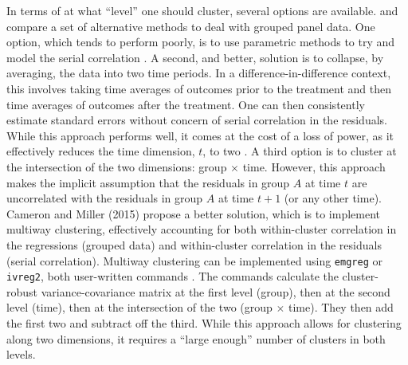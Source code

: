 \documentclass[11pt]{article}
\begin{document}
In terms of at what ``level'' one should cluster, several options are available. \cite{bertrand_how_2004} and \cite{angrist_mostly_2009} compare a set of alternative methods to deal with grouped panel data. One option, which tends to perform poorly, is to use parametric methods to try and model the serial correlation \citep{bertrand_how_2004}. A second, and better, solution is to collapse, by averaging, the data into two time periods. In a difference-in-difference context, this involves taking time averages of outcomes prior to the treatment and then time averages of outcomes after the treatment. One can then consistently estimate standard errors without concern of serial correlation in the residuals. While this approach performs well, it comes at the cost of a loss of power, as it effectively reduces the time dimension, $t$, to two \citep{mckenzie_beyond_2012}. A third option is to cluster at the intersection of the two dimensions: group $\times$ time. However, this approach makes the implicit assumption that the residuals in group $A$ at time $t$ are uncorrelated with the residuals in group $A$ at time $t+1$ (or any other time). Cameron and Miller (2015) propose a better solution, which is to implement multiway clustering, effectively accounting for both within-cluster correlation in the regressions (grouped data) and within-cluster correlation in the residuals (serial correlation). Multiway clustering can be implemented using \texttt{emgreg} or \texttt{ivreg2}, both user-written commands \citep{baum_ivreg2_2002, cameron_robust_2011, baum_enhanced_2007}. The commands calculate the cluster-robust variance-covariance matrix at the first level (group), then at the second level (time), then at the intersection of the two (group $\times$ time). They then add the first two and subtract off the third. While this approach allows for clustering along two dimensions, it requires a ``large enough'' number of clusters in both levels.
\end{document}

